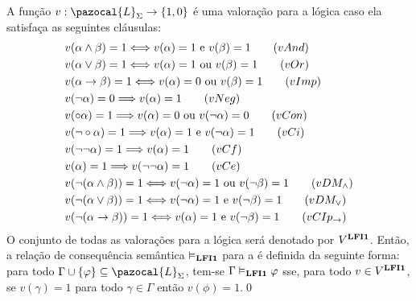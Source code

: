         \begin{definicao} \label{def:valoracoes}
            A função $v : \pazocal{L}_{\Sigma} \to \{1, 0\}$ é uma valoração para a lógica \lfium{} caso ela satisfaça as seguintes cláusulas:
            \begin{align*}
                & v(\alpha \land \beta) = 1 \Longleftrightarrow v(\alpha) = 1 \text{ e } v(\beta) = 1\tag{\textbf{$vAnd$}}\\
                & v(\alpha \lor \beta) = 1 \Longleftrightarrow v(\alpha) = 1 \text{ ou } v(\beta) = 1\tag{\textbf{$vOr$}}\\
                & v(\alpha \to \beta) = 1 \Longleftrightarrow v(\alpha) = 0 \text{ ou } v(\beta) = 1\tag{\textbf{$vImp$}}\\
                & v(\neg \alpha) = 0 \Longrightarrow v(\alpha) = 1\tag{\textbf{$vNeg$}}\\
                & v(\circ \alpha) = 1 \Longrightarrow v(\alpha) = 0 \text{ ou } v(\neg \alpha) = 0\tag{\textbf{$vCon$}}\\
                & v(\neg \circ \alpha) = 1 \Longrightarrow v(\alpha) = 1 \text{ e } v(\neg \alpha) = 1\tag{\textbf{$vCi$}}\\
                & v(\neg \neg \alpha) = 1 \Longrightarrow v(\alpha) = 1\tag{\textbf{$vCf$}}\\
                & v(\alpha) = 1 \Longrightarrow v(\neg \neg \alpha) = 1\tag{\textbf{$vCe$}}\\
                & v(\neg (\alpha \land \beta)) = 1 \Longleftrightarrow v(\neg \alpha) = 1 \text{ ou } v(\neg \beta) = 1\tag{\textbf{$vDM_{\land}$}}\\
                & v(\neg (\alpha \lor \beta)) = 1 \Longleftrightarrow v(\neg \alpha) = 1 \text{ e } v(\neg \beta) = 1\tag{\textbf{$vDM_{\lor}$}}\\
                & v(\neg (\alpha \to \beta)) = 1 \Longleftrightarrow v(\alpha) = 1 \text{ e } v(\neg \beta) = 1\tag{\textbf{$vCIp_{\to}$}}
            \end{align*}
            O conjunto de todas as valorações para a lógica \lfium{} será denotado por $V^{{\normalfont\textbf{LFI1}}{}}$. Então, a relação de consequência semântica $\vDash_{{\normalfont\textbf{LFI1}}{}}$ para a \lfium{} é definida da seguinte forma: para todo $\Gamma \cup \{\phi\} \subseteq \pazocal{L}_{\Sigma}$, tem-se $\Gamma \vDash_{{\normalfont\textbf{LFI1}}{}} \varphi$ sse, para todo $v \in V^{{\normalfont\textbf{LFI1}}{}}$, se $v(\gamma) = 1$ para todo $\gamma \in \Gamma$ então $v(\phi) = 1$.\qed{}
        \end{definicao}
         

